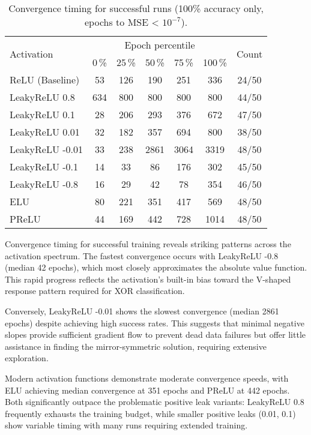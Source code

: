 \begin{table}[ht]
\centering
\caption{Convergence timing for successful runs (100\% accuracy only, epochs to MSE < $10^{-7}$).}
\label{tab:relu1-activation-timing}
\begin{tabular}{lcccccc}
\toprule
\multirow{2}{*}{Activation} &
\multicolumn{5}{c}{Epoch percentile} & \multirow{2}{*}{Count} \\
\cmidrule(lr){2-6}
 & 0\,\% & 25\,\% & 50\,\% & 75\,\% & 100\,\% & \\
\midrule
ReLU (Baseline) & 53 & 126 & 190 & 251 & 336 & 24/50 \\
LeakyReLU 0.8 & 634 & 800 & 800 & 800 & 800 & 44/50 \\
LeakyReLU 0.1 & 28 & 206 & 293 & 376 & 672 & 47/50 \\
LeakyReLU 0.01 & 32 & 182 & 357 & 694 & 800 & 38/50 \\
LeakyReLU -0.01 & 33 & 238 & 2861 & 3064 & 3319 & 48/50 \\
LeakyReLU -0.1 & 14 & 33 & 86 & 176 & 302 & 45/50 \\
LeakyReLU -0.8 & 16 & 29 & 42 & 78 & 354 & 46/50 \\
ELU & 80 & 221 & 351 & 417 & 569 & 48/50 \\
PReLU & 44 & 169 & 442 & 728 & 1014 & 48/50 \\
\bottomrule
\end{tabular}
\end{table}

Convergence timing for successful training reveals striking patterns across the activation spectrum. The fastest convergence occurs with LeakyReLU -0.8 (median 42 epochs), which most closely approximates the absolute value function. This rapid progress reflects the activation's built-in bias toward the V-shaped response pattern required for XOR classification.

Conversely, LeakyReLU -0.01 shows the slowest convergence (median 2861 epochs) despite achieving high success rates. This suggests that minimal negative slopes provide sufficient gradient flow to prevent dead data failures but offer little assistance in finding the mirror-symmetric solution, requiring extensive exploration.

Modern activation functions demonstrate moderate convergence speeds, with ELU achieving median convergence at 351 epochs and PReLU at 442 epochs. Both significantly outpace the problematic positive leak variants: LeakyReLU 0.8 frequently exhausts the training budget, while smaller positive leaks (0.01, 0.1) show variable timing with many runs requiring extended training.

